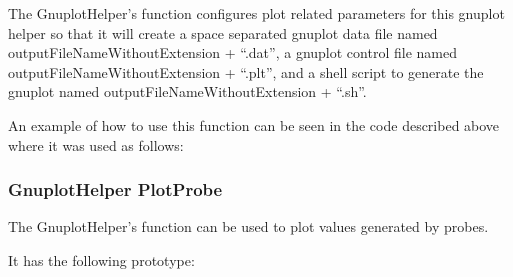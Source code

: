 \documentclass[letterpaper,10pt,english]{sphinxmanual}
\renewcommand{\sphinxcode}[1]{\texttt{\small{#1}}}
\begin{document}
The GnuplotHelper’s \sphinxcode{} function configures plot
related parameters for this gnuplot helper so
that it will create a space separated gnuplot data file named
outputFileNameWithoutExtension + “.dat”, a gnuplot control file
named outputFileNameWithoutExtension + “.plt”, and a shell script
to generate the gnuplot named outputFileNameWithoutExtension +
“.sh”.

An example of how to use this function can be seen in the
\sphinxcode{} code described above where it was used as follows:

\begin{sphinxVerbatim}[commandchars=\\\{\}]
 
\end{sphinxVerbatim}


\subsubsection{GnuplotHelper PlotProbe}
\label{\detokenize{data-collection-helpers:gnuplothelper-plotprobe}}
The GnuplotHelper’s \sphinxcode{} function can be used
to plot values generated by probes.

It has the following prototype:

\begin{sphinxVerbatim}[commandchars=\\\{\}]
    
                  
                  
                  
                    
\end{sphinxVerbatim}
\end{document}
